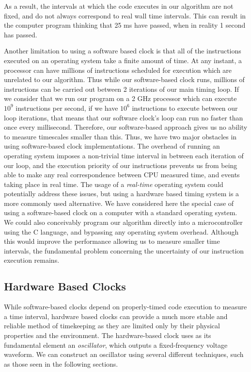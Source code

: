 As a result, the intervals at which the code executes in our algorithm are not fixed, and do not always correspond to real wall time intervals.  This can result in the computer program thinking that 25 ms have passed, when in reality 1 second has passed.                              
                                       
Another limitation to using a software based clock is that all of the
instructions executed on an operating system take a finite amount of time.  At
any instant, a processor can have millions of instructions scheduled for
execution which are unrelated to our algorithm.  Thus while our software-based
clock runs, millions of instructions can be carried out between 2 iterations
of our main timing loop.   If we consider that we run our program on a 2 GHz
processor which can execute $10^9$ instructions per second, if we have $10^6$
instructions to execute between our loop iterations, that means that our
software clock's loop can run no faster than once every millisecond.
Therefore, our software-based approach gives us no ability to measure timescales smaller than this.
Thus, we have two major obstacles in using software-based clock
implementations.  The overhead of running an operating system imposes a
non-trivial time interval in between each iteration of our loop, and the
execution priority of our instructions prevents us from being able to make any real correspondence between CPU measured time, and events taking place in real time.
The usage of a \emph{real-time} operating system could potentially address these issues, but using a hardware based timing system is a more commonly used alternative.
We have considered here the special case of using a software-based clock on a
computer with a standard operating system.  We could also conceivably program
our algorithm directly into a microcontroller using the C language, and
bypassing any operating system overhead.  Although this would improve the
performance allowing us to measure smaller time intervals, the fundamental problem concerning the uncertainty of our instruction execution remains.



\subsection{Hardware Based Clocks} 

While software-based clocks depend on properly-timed code execution to measure
a time interval, hardware based clocks  can provide a much more stable and
reliable method of timekeeping as they are limited only by their physical
properties and the environment.  The hardware-based clock uses as its
fundamental element an \emph{oscillator}, which outputs a fixed-frequency
voltage waveform.  We can construct an oscillator using several different techniques, such as those seen in the following sections.

